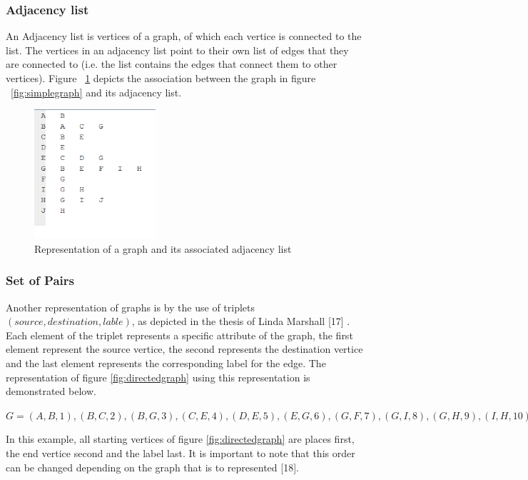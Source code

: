 \subsubsection{Adjacency list}
An Adjacency list is vertices of a graph, of which each vertice is connected to the list. The vertices in an adjacency list point to their own list of edges that they are connected to 
(i.e. the list contains the edges that connect them to other vertices).
Figure ~\ref{fig:adjacencylist} depicts the association between the graph in figure ~\ref{fig:simplegraph} and its adjacency list.
\begin{figure}[H]
  \begin{center}
      \includegraphics[width=0.4\textwidth]{list.png}
  \end{center}    
  \caption{Representation of a graph and its associated adjacency list}
  \label{fig:adjacencylist}
\end{figure}

\subsubsection{Set of Pairs}
Another representation of graphs is by the use of triplets $(source,destination,lable)$, as depicted in the thesis of Linda Marshall [17] . 
Each element of the triplet represents a specific attribute of the graph, the first element represent the source vertice, the second represents 
the destination vertice and the last element represents the corresponding label for the edge. The representation of figure \ref{fig:directedgraph} 
using this representation is demonstrated below.
\begin{myEnumerate}
  \item $G = {(A,B,1), (B,C,2), (B,G,3), (C,E,4), (D,E,5), (E,G,6), (G,F,7), (G,I,8),(G,H,9), (I,H,10), (H,I,11)}$
\end{myEnumerate}
In this example, all starting vertices of figure \ref{fig:directedgraph} are places first, the end vertice second and the label last. It is important 
to note that this order can be changed depending on the graph that is to represented [18].

